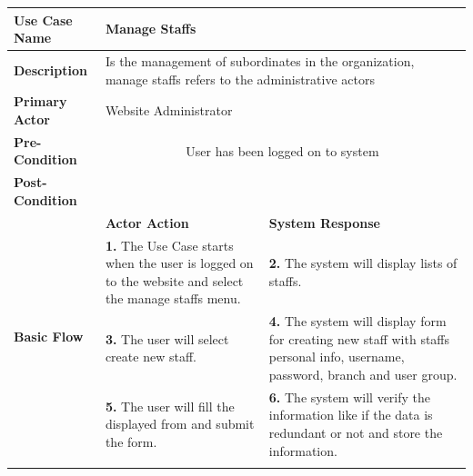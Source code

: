 \begin{table}[!h]
\begin{tabular}{|l|p{6cm}|p{6cm}|}
\hline 
\rule[-1ex]{0pt}{2.5ex} \textbf{Use Case Name} & \multicolumn{2}{p{10cm}|}{Manage Staffs} \\ 
\hline 
\rule[-1ex]{0pt}{2.5ex} \textbf{Description} &\multicolumn{2}{p{10cm}|}{Is the management of subordinates in the organization, manage staffs refers to the administrative actors} \\ 
\hline 
\rule[-1ex]{0pt}{2.5ex} \textbf{Primary Actor}& \multicolumn{2}{p{10cm}|}{Website Administrator} \\ 
\hline 
\rule[-1ex]{0pt}{2.5ex} \textbf{Pre-Condition} & \multicolumn{2}{c|}{User has been logged on to system} \\ 
\hline 
\rule[-1ex]{0pt}{2.5ex} \textbf{Post-Condition} & \multicolumn{2}{p{10cm}|}{}  \\ 
\hline 
\multirow{4}{*}{\textbf{Basic Flow}} & \textbf{Actor Action} & \textbf{System Response}\\
\cline{2-3}
%
&
\textbf{1.}  The Use Case starts when the user is logged on to the website and select the manage staffs menu.
& 
\textbf{2.}  The system will display lists of staffs.
\\
%
&
\textbf{3.}  The user will select create new staff.
& 
\textbf{4.}  The system will display form for creating new staff with staffs personal info, username, password, branch and user group. 
\\
%
&
\textbf{5.}  The user will fill the displayed from and submit the form.
& 
\textbf{6.}  The system will verify the information like if the data is redundant or not and store the information. 
\\
%
&


\end{tabular}
\end{table}
